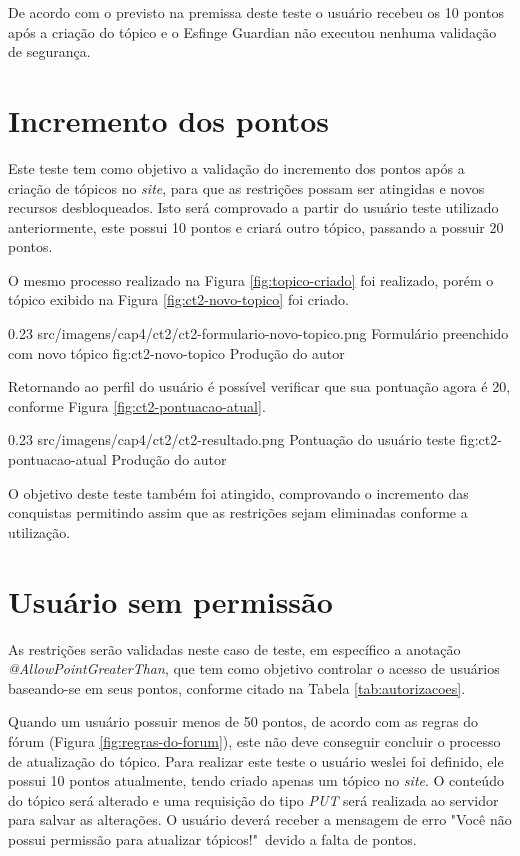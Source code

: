 \par De acordo com o previsto na premissa deste teste o usuário recebeu os 10 pontos após a criação do tópico e o Esfinge Guardian não executou nenhuma validação de segurança.

\section{Incremento dos pontos}

\par Este teste tem como objetivo a validação do incremento dos pontos após a criação de tópicos no \textit{site}, para que as restrições possam ser atingidas e novos recursos desbloqueados. Isto será comprovado a partir do usuário teste utilizado anteriormente, este possui 10 pontos e criará outro tópico, passando a possuir 20 pontos.

\par O mesmo processo realizado na Figura \ref{fig:topico-criado} foi realizado, porém o tópico exibido na Figura \ref{fig:ct2-novo-topico} foi criado.

\begin{image}
{0.23}
{src/imagens/cap4/ct2/ct2-formulario-novo-topico.png}
{Formulário preenchido com novo tópico}
{fig:ct2-novo-topico}
{Produção do autor}
\end{image}

\par Retornando ao perfil do usuário é possível verificar que sua pontuação agora é 20, conforme Figura \ref{fig:ct2-pontuacao-atual}.

\begin{image}
{0.23}
{src/imagens/cap4/ct2/ct2-resultado.png}
{Pontuação do usuário teste}
{fig:ct2-pontuacao-atual}
{Produção do autor}
\end{image}

\par O objetivo deste teste também foi atingido, comprovando o incremento das conquistas permitindo assim que as restrições sejam eliminadas conforme a utilização.

\section{Usuário sem permissão}

\par As restrições serão validadas neste caso de teste, em específico a anotação \textit{@AllowPointGreaterThan}, que tem como objetivo controlar o acesso de usuários baseando-se em seus pontos, conforme citado na Tabela \ref{tab:autorizacoes}.
\par Quando um usuário possuir menos de 50 pontos, de acordo com as regras do fórum (Figura \ref{fig:regras-do-forum}), este não deve conseguir concluir o processo de atualização do tópico. Para realizar este teste o usuário weslei foi definido, ele possui 10 pontos atualmente, tendo criado apenas um tópico no \textit{site}. O conteúdo do tópico será alterado e uma requisição do tipo \textit{PUT} será realizada ao servidor para salvar as alterações. O usuário deverá receber a mensagem de erro "Você não possui permissão para atualizar tópicos!"\ devido a falta de pontos.

